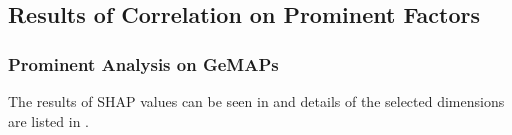 



\subsection{Results of Correlation on Prominent Factors}
\subsubsection{Prominent Analysis on GeMAPs}
\label{sec:prominentfactor}


The results of SHAP values can be seen in  and details of the selected dimensions are listed in .

